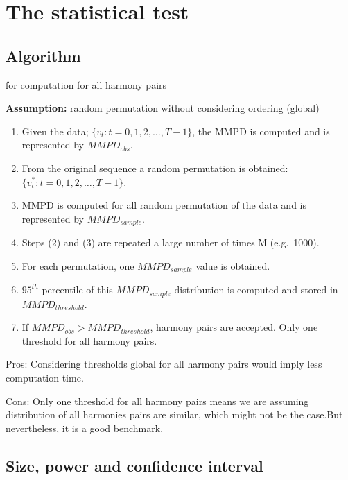 \documentclass[
]{article}
\begin{document}
\hypertarget{the-statistical-test}{%
\section{The statistical test}\label{the-statistical-test}}

\hypertarget{algorithm}{%
\subsection{Algorithm}\label{algorithm}}

for computation for all harmony pairs

\textbf{Assumption:} random permutation without considering ordering
(global)

\begin{enumerate}
\def\labelenumi{\arabic{enumi}.}
\item
  Given the data; \(\{v_t: t=0, 1, 2, \dots, T-1\}\), the MMPD is computed and is represented by \(MMPD_{obs}\).
\item
  From the original sequence a random permutation is obtained: \(\{v_t^*: t=0, 1, 2, \dots, T-1\}\).
\item
  MMPD is computed for all random permutation of the data and is represented by \(MMPD_{sample}\).
\item
  Steps (2) and (3) are repeated a large number
  of times M (e.g.~1000).
\item
  For each permutation, one \(MMPD_{sample}\) value is obtained.
\item
  \(95^{th}\) percentile of this \(MMPD_{sample}\) distribution is computed and stored in \(MMPD_{threshold}\).
\item
  If \(MMPD_{obs}> MMPD_{threshold}\), harmony pairs are accepted. Only one threshold for all harmony pairs.
\end{enumerate}

Pros: Considering thresholds global for all harmony pairs would imply less computation time.

Cons: Only one threshold for all harmony pairs means we are assuming distribution of all harmonies pairs are similar, which might not be the case.But nevertheless, it is a good benchmark.

\hypertarget{size-power-and-confidence-interval}{%
\subsection{Size, power and confidence interval}\label{size-power-and-confidence-interval}}
\end{document}
